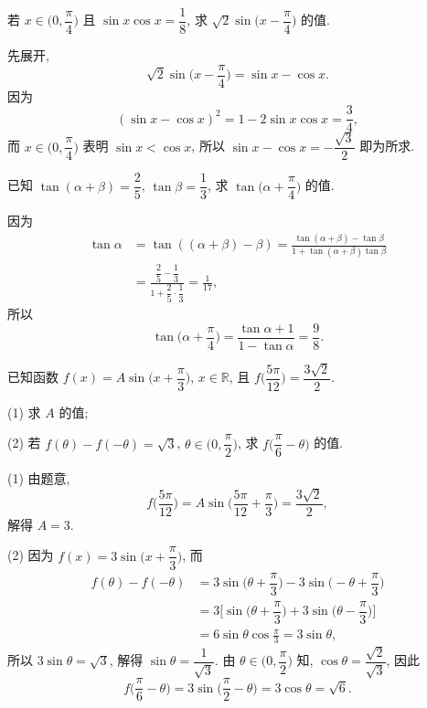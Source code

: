 \begin{exercise}
    若 $x\in\Big(0,\dfrac\pi4\Big)$ 且 $\sin x\cos x=\dfrac18$, 
    求 $\sqrt2\sin\Big(x-\dfrac\pi4\Big)$ 的值.
\end{exercise}
\beginsolution
    先展开,
    \[\sqrt2\sin\Big(x-\dfrac\pi4\Big)= \sin x- \cos x.\]
    因为
    \[(\sin x- \cos x)^2= 1- 2\sin x\cos x= \frac34,\]
    而 $x\in\Big(0,\dfrac\pi4\Big)$ 表明 $\sin x< \cos x$, 所以 $\sin x- \cos x= -\dfrac{\sqrt3}{2}$ 即为所求.
\endsolution

\begin{exercise}
    已知 $\tan(\alpha+\beta)=\dfrac25$, $\tan\beta=\dfrac13$, 
    求 $\tan\Big(\alpha+\dfrac\pi4\Big)$ 的值.
\end{exercise}
\beginsolution
    因为 
    \[\begin{aligned}
        \tan\alpha
        &= \tan((\alpha+\beta)- \beta)
         = \frac{\tan(\alpha+\beta)- \tan\beta}{1+ \tan(\alpha+\beta)\tan\beta}\\
        &= \frac{\dfrac25- \dfrac13}{1+ \dfrac25\cdot\dfrac13}
         = \frac{1}{17},
    \end{aligned}\]
    所以
    \[\tan\Big(\alpha+\dfrac\pi4\Big)
        = \frac{\tan\alpha+1}{1-\tan\alpha}
        = \frac98.\]
\endsolution

\begin{exercise}
    已知函数 $f(x)= A\sin\Big(x+ \dfrac\pi3\Big)$, $x\in\mathbb{R}$, 且 $f\Big(\dfrac{5\pi}{12}\Big)= \dfrac{3\sqrt2}2$.
    
    (1) 求 $A$ 的值;
    
    (2) 若 $f(\theta)-f(-\theta)= \sqrt3$, $\theta\in\Big(0,\dfrac\pi2\Big)$, 求 $f\Big(\dfrac\pi6-\theta\Big)$ 的值.
\end{exercise}
\beginsolution
    (1) 由题意,
    \[f\Big(\dfrac{5\pi}{12}\Big)
        = A\sin\Big(\dfrac{5\pi}{12}+ \dfrac\pi3\Big)
        = \dfrac{3\sqrt2}2,\]
    解得 $A=3$.

    (2) 因为 $f(x)= 3\sin\Big(x+ \dfrac\pi3\Big)$, 而
    \[\begin{aligned}
        f(\theta)-f(-\theta)
        &= 3\sin\Big(\theta+ \dfrac\pi3\Big)
            - 3\sin\Big(-\theta+ \dfrac\pi3\Big)\\
        &= 3\biggl[\sin\Big(\theta+ \dfrac\pi3\Big)
            + 3\sin\Big(\theta- \dfrac\pi3\Big)\biggr]\\
        &= 6\sin\theta\cos\frac\pi3
         = 3\sin\theta,
    \end{aligned}\]
    所以 $3\sin\theta= \sqrt3$, 解得 $\sin\theta= \dfrac1{\sqrt3}$. 由 $\theta\in\Big(0,\dfrac\pi2\Big)$ 知, $\cos\theta= \dfrac{\sqrt2}{\sqrt3}$, 因此
    \[f\Big(\dfrac\pi6-\theta\Big)
        = 3\sin\Big(\dfrac\pi2- \theta\Big)
        = 3\cos\theta= \sqrt6.\]
\endsolution

